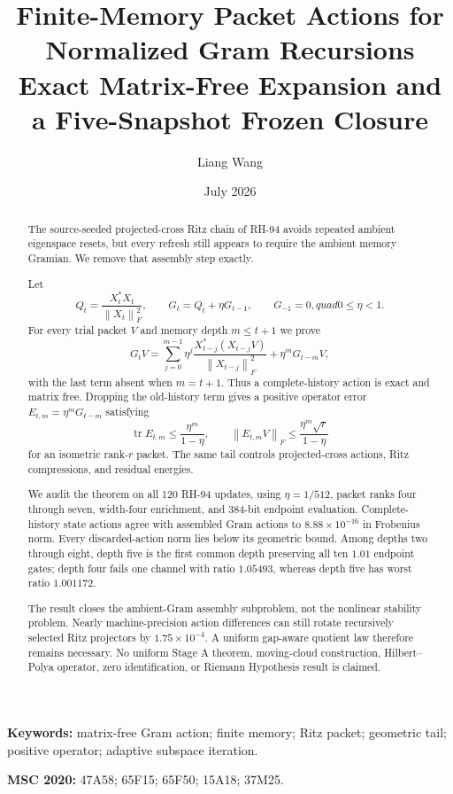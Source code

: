 \documentclass[11pt]{article}
\title{Finite-Memory Packet Actions for Normalized Gram Recursions\\
\large Exact Matrix-Free Expansion and a Five-Snapshot Frozen Closure}
\author{Liang Wang}
\date{July 2026}
\theoremstyle{definition}
\theoremstyle{remark}
\newcommand{\norm}[1]{\left\lVert#1\right\rVert}
\newcommand{\tr}{\operatorname{tr}}
\begin{document}
\maketitle

\begin{abstract}
The source-seeded projected-cross Ritz chain of RH-94 avoids repeated ambient
eigenspace resets, but every refresh still appears to require the ambient
memory Gramian.  We remove that assembly step exactly.

Let
\[
 Q_t=\frac{X_t^*X_t}{\norm{X_t}_F^2},\qquad
 G_t=Q_t+\eta G_{t-1},\qquad G_{-1}=0,quad 0\le\eta<1.
\]
For every trial packet $V$ and memory depth $m\le t+1$ we prove
\[
 G_tV=\sum_{j=0}^{m-1}\eta^j
 \frac{X_{t-j}^*(X_{t-j}V)}{\norm{X_{t-j}}_F^2}
 +\eta^mG_{t-m}V,
\]
with the last term absent when $m=t+1$.  Thus a complete-history action is
exact and matrix free.  Dropping the old-history term gives a positive
operator error $E_{t,m}=\eta^mG_{t-m}$ satisfying
\[
 \tr E_{t,m}\le\frac{\eta^m}{1-\eta},\qquad
 \norm{E_{t,m}V}_F\le\frac{\eta^m\sqrt r}{1-\eta}
\]
for an isometric rank-$r$ packet.  The same tail controls projected-cross
actions, Ritz compressions, and residual energies.

We audit the theorem on all 120 RH-94 updates, using $\eta=1/512$, packet
ranks four through seven, width-four enrichment, and 384-bit endpoint
evaluation.  Complete-history state actions agree with assembled Gram actions
to $8.88\times10^{-16}$ in Frobenius norm.  Every discarded-action norm lies
below its geometric bound.  Among depths two through eight, depth five is the
first common depth preserving all ten $1.01$ endpoint gates; depth four fails
one channel with ratio $1.05493$, whereas depth five has worst ratio
$1.001172$.

The result closes the ambient-Gram assembly subproblem, not the nonlinear
stability problem.  Nearly machine-precision action differences can still
rotate recursively selected Ritz projectors by $1.75\times10^{-4}$.  A
uniform gap-aware quotient law therefore remains necessary.  No uniform
Stage A theorem, moving-cloud construction, Hilbert--Polya operator, zero
identification, or Riemann Hypothesis result is claimed.
\end{abstract}

\noindent\textbf{Keywords:} matrix-free Gram action; finite memory; Ritz
packet; geometric tail; positive operator; adaptive subspace iteration.

\medskip
\noindent\textbf{MSC 2020:} 47A58; 65F15; 65F50; 15A18; 37M25.
\end{document}
